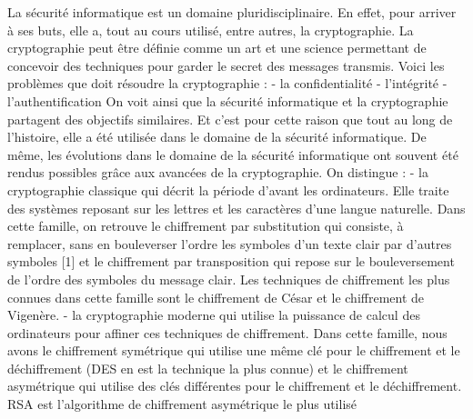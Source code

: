 La sécurité informatique est un domaine pluridisciplinaire. En effet, pour arriver à ses buts, elle a, tout au cours utilisé, entre autres, la cryptographie. La cryptographie peut être définie comme un art et une science permettant de concevoir des techniques pour garder le secret des messages transmis. Voici les problèmes que doit résoudre la cryptographie :
-	la confidentialité
-	l’intégrité
-	l’authentification
On voit ainsi que la sécurité informatique et la cryptographie partagent des objectifs similaires. Et c’est pour cette raison que tout au long de l’histoire, elle a été utilisée dans le domaine de la sécurité informatique. De même, les évolutions dans le domaine de la sécurité informatique ont souvent été rendus possibles grâce aux avancées de la cryptographie.
On distingue :
-	la cryptographie classique qui décrit la période d’avant les ordinateurs. Elle traite des systèmes reposant sur les lettres et les caractères d’une langue naturelle. Dans cette famille, on retrouve le chiffrement par substitution qui consiste, à remplacer, sans en bouleverser l’ordre les symboles d’un texte clair par d’autres symboles [1] et le chiffrement par transposition qui repose sur le bouleversement de l’ordre des symboles du message clair. Les techniques de chiffrement les plus connues dans cette famille sont le chiffrement de César et le chiffrement de Vigenère.
-	 la cryptographie moderne qui utilise la puissance de calcul des ordinateurs pour affiner ces techniques de chiffrement. Dans cette famille, nous avons le chiffrement symétrique qui utilise une même clé pour le chiffrement et le déchiffrement (DES en est la technique la plus connue) et le chiffrement asymétrique qui utilise des clés différentes pour le chiffrement et le déchiffrement. RSA est l’algorithme de chiffrement asymétrique le plus utilisé


\clearpage 
